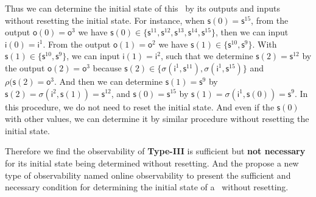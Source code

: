 Thus we can determine the initial state of this \BCN\ by its outputs and inputs without resetting the initial state. For instance, when $\mathsf{s}(0)=\mathsf{s}^{15}$, from the output $\mathsf{o}(0)=\mathsf{o}^3$ we have $\mathsf{s}(0)\in \{\mathsf{s}^{11},\mathsf{s}^{12},\mathsf{s}^{13},\mathsf{s}^{14},\mathsf{s}^{15}\}$, then we can input $\mathsf{i}(0)=\mathsf{i}^1$. From the output $\mathsf{o}(1)=\mathsf{o}^2$ we have $\mathsf{s}(1)\in\{\mathsf{s}^{10},\mathsf{s}^{9}\}$. With $\mathsf{s}(1)\in\{\mathsf{s}^{10},\mathsf{s}^{9}\}$, we can input $\mathsf{i}(1)=\mathsf{i}^2$, such that we determine $\mathsf{s}(2)=\mathsf{s}^{12}$ by the output $\mathsf{o}(2)=\mathsf{o}^3$ because $\mathsf{s}(2)\in\{\sigma (\mathsf{i}^1, \mathsf{s}^{11}),\sigma (\mathsf{i}^1, \mathsf{s}^{15})\}$ and $\rho(\mathsf{s}(2)=\mathsf{o}^3$. And then we can determine $\mathsf{s}(1)=\mathsf{s}^{9}$ by $\mathsf{s}(2)=\sigma (\mathsf{i}^2,\mathsf{s}(1))=\mathsf{s}^{12}$, and $\mathsf{s}(0)=\mathsf{s}^{15}$ by $\mathsf{s}(1)=\sigma (\mathsf{i}^1,\mathsf{s}(0))=\mathsf{s}^{9}$. In this procedure, we do not need to reset the initial state. And even if the $\mathsf{s}(0)$ with other values, we can determine it by similar procedure without resetting the initial state.



Therefore we find the observability of  {\bf Type-III}  is sufficient but {\bf not necessary} for its initial state being determined without resetting. And the propose a new type of observability named online observability to present the sufficient and necessary condition for determining the initial state of a \BCN\  without  resetting.


   

